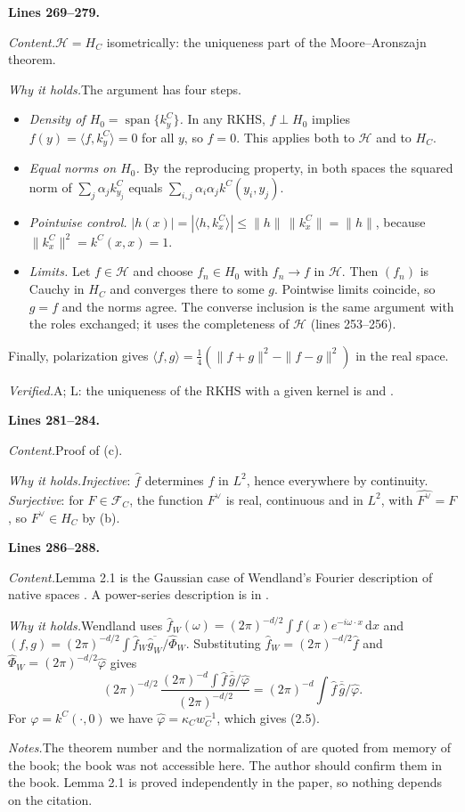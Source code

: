 \documentclass[11pt]{amsart}
\newcommand{\dd}{\,\mathrm{d}}
\newcommand{\FC}[1]{\mathcal{F}_{#1}}
\newcommand{\ip}[2]{\langle #1,#2\rangle}
\newcommand{\hatf}[1]{\widehat{#1}}
\newcommand{\src}[1]{\par\bigskip\noindent\textbf{Lines #1.}\enspace}
\newcommand{\content}{\par\smallskip\noindent\textit{Content.}\enspace}
\newcommand{\why}{\par\smallskip\noindent\textit{Why it holds.}\enspace}
\newcommand{\verified}{\par\smallskip\noindent\textit{Verified.}\enspace}
\newcommand{\notes}{\par\smallskip\noindent\textit{Notes.}\enspace}
\newcommand{\tA}{\textsf{A}}
\newcommand{\tL}{\textsf{L}}
\begin{document}
\src{269--279}
\content $\mathcal H=H_C$ isometrically: the uniqueness part of the Moore--Aronszajn theorem.
\why The argument has four steps.
\begin{itemize}
\item \emph{Density of $H_0=\operatorname{span}\{k^C_y\}$.} In any RKHS, $f\perp H_0$ implies
$f(y)=\ip f{k^C_y}=0$ for all $y$, so $f=0$. This applies both to $\mathcal H$ and to $H_C$.
\item \emph{Equal norms on $H_0$.} By the reproducing property, in both spaces the squared norm of
$\sum_j\alpha_jk^C_{y_j}$ equals $\sum_{i,j}\alpha_i\alpha_jk^C(y_i,y_j)$.
\item \emph{Pointwise control.} $|h(x)|=|\ip h{k^C_x}|\le\|h\|\,\|k^C_x\|=\|h\|$, because $\|k^C_x\|^2=k^C(x,x)=1$.
\item \emph{Limits.} Let $f\in\mathcal H$ and choose $f_n\in H_0$ with $f_n\to f$ in $\mathcal H$. Then $(f_n)$ is
Cauchy in $H_C$ and converges there to some $g$. Pointwise limits coincide, so $g=f$ and the norms agree. The converse
inclusion is the same argument with the roles exchanged; it uses the completeness of $\mathcal H$ (lines 253--256).
\end{itemize}
Finally, polarization gives $\ip fg=\frac14(\|f+g\|^2-\|f-g\|^2)$ in the real space.
\verified \tA; \tL: the uniqueness of the RKHS with a given kernel is \cite{Aronszajn} and \cite{PaulsenRaghupathi}.

\src{281--284}
\content Proof of (c).
\why \emph{Injective}: $\hatf f$ determines $f$ in $L^2$, hence everywhere by continuity. \emph{Surjective}: for
$F\in\FC{C}$, the function $F^\vee$ is real, continuous and in $L^2$, with $\hatf{F^\vee}=F$, so $F^\vee\in H_C$ by
(b).

\src{286--288}
\content Lemma 2.1 is the Gaussian case of Wendland's Fourier description of native spaces \cite[Theorem
10.12]{Wendland}. A power-series description is in \cite{SHS}.
\why Wendland uses $\hatf f_W(\omega)=(2\pi)^{-d/2}\int f(x)e^{-i\omega\cdot x}\dd x$ and
$(f,g)=(2\pi)^{-d/2}\int\hatf f_W\overline{\hatf g_W}/\hatf\Phi_W$. Substituting $\hatf f_W=(2\pi)^{-d/2}\hatf f$ and
$\hatf\Phi_W=(2\pi)^{-d/2}\hatf\varphi$ gives
\[
(2\pi)^{-d/2}\,\frac{(2\pi)^{-d}\int\hatf f\,\overline{\hatf g}/\hatf\varphi}{(2\pi)^{-d/2}}
=(2\pi)^{-d}\int\hatf f\,\overline{\hatf g}/\hatf\varphi .
\]
For $\varphi=k^C(\cdot,0)$ we have $\hatf\varphi=\kappa_Cw_C^{-1}$, which gives (2.5).
\notes The theorem number and the normalization of \cite{Wendland} are quoted from memory of the book; the book was
not accessible here. The author should confirm them in the book. Lemma 2.1 is proved independently in the paper, so
nothing depends on the citation.
\end{document}
